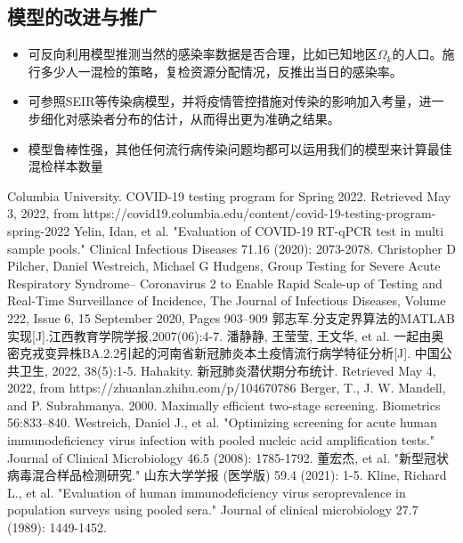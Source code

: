 \documentclass[withoutpreface,bwprint]{cumcmthesis} %
\begin{document}
\subsection{模型的改进与推广}
\begin{itemize}
    \item 可反向利用模型推测当然的感染率数据是否合理，比如已知地区$\Omega_k$的人口。施行多少人一混检的策略，复检资源分配情况，反推出当日的感染率。
    
    \item 可参照SEIR等传染病模型，并将疫情管控措施对传染的影响加入考量，进一步细化对感染者分布的估计，从而得出更为准确之结果。
    
    \item 模型鲁棒性强，其他任何流行病传染问题均都可以运用我们的模型来计算最佳混检样本数量
\end{itemize}

\newpage

\begin{thebibliography}{100}
Columbia University. COVID-19 testing program for Spring 2022. Retrieved May 3, 2022, from https://covid19.columbia.edu/content/covid-19-testing-program-spring-2022
Yelin, Idan, et al. "Evaluation of COVID-19 RT-qPCR test in multi sample pools." Clinical Infectious Diseases 71.16 (2020): 2073-2078.
Christopher D Pilcher, Daniel Westreich, Michael G Hudgens, Group Testing for Severe Acute Respiratory Syndrome– Coronavirus 2 to Enable Rapid Scale-up of Testing and Real-Time Surveillance of Incidence, The Journal of Infectious Diseases, Volume 222, Issue 6, 15 September 2020, Pages 903–909
郭志军.分支定界算法的MATLAB实现[J].江西教育学院学报,2007(06):4-7.
潘静静, 王莹莹, 王文华, et al. 一起由奥密克戎变异株BA.2.2引起的河南省新冠肺炎本土疫情流行病学特征分析[J]. 中国公共卫生, 2022, 38(5):1-5.
Hahakity. 新冠肺炎潜伏期分布统计. Retrieved May 4, 2022, from https://zhuanlan.zhihu.com/p/104670786
Berger, T., J. W. Mandell, and P. Subrahmanya. 2000. Maximally efficient two-stage screening. Biometrics 56:833–840.
Westreich, Daniel J., et al. "Optimizing screening for acute human immunodeficiency virus infection with pooled nucleic acid amplification tests." Journal of Clinical Microbiology 46.5 (2008): 1785-1792.
董宏杰, et al. "新型冠状病毒混合样品检测研究." 山东大学学报 (医学版) 59.4 (2021): 1-5.
Kline, Richard L., et al. "Evaluation of human immunodeficiency virus seroprevalence in population surveys using pooled sera." Journal of clinical microbiology 27.7 (1989): 1449-1452.

\end{thebibliography}
\end{document}
